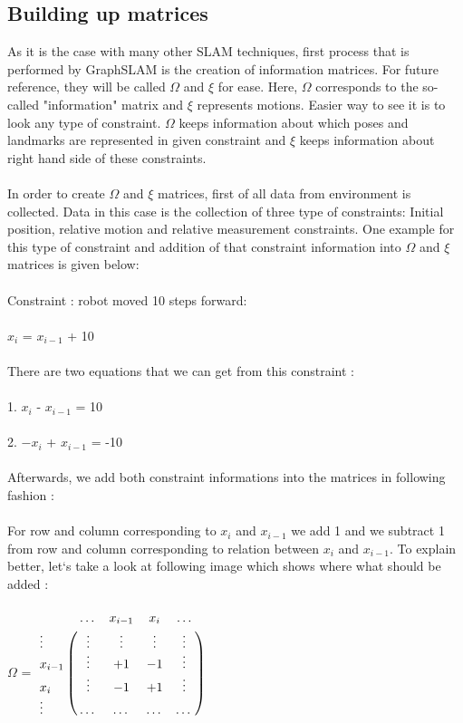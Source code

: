 \documentclass{ba-kecs}
\numberwithin{figure}{section}
\begin{document}
\subsection{Building up matrices}
	As it is the case with many other SLAM techniques, first process that is performed by GraphSLAM is the creation of information matrices. For future reference, they will be called $\Omega$ and $\xi$ for ease. Here, $\Omega$ corresponds to the so-called "information" matrix and $\xi$ represents motions. Easier way to see it is to look any type of constraint. $\Omega$ keeps information about which poses and landmarks are represented in given constraint and $\xi$ keeps information about right hand side of these constraints.\\ \\
	In order to create $\Omega$ and $\xi$ matrices, first of all data from environment is collected. Data in this case is the collection of three type of constraints: Initial position, relative motion and relative measurement constraints. One example for this type of constraint and addition of that constraint information into $\Omega$ and $\xi$ matrices is given below:\\ \\
	Constraint : robot moved 10 steps forward:\\ \\ $x_{i}$ = $x_{i-1}$ + 10 \\ \\
	There are two equations that we can get from this constraint : \\ \\
	1. $x_{i}$ - $x_{i-1}$ = 10 \\ \\
	2. $-x_{i}$ + $x_{i-1}$ = -10\\ \\
	Afterwards, we add both constraint informations into the matrices in following fashion :\\ \\
	For row and column corresponding to $x_{i}$ and $x_{i-1}$ we add 1 and we subtract 1 from row and column corresponding to relation between $x_{i}$ and $x_{i-1}$. To explain better, let`s take a look at following image which shows where what should be added :\\ \\
	$\Omega$ = $\bordermatrix{~ & \dots & x_{i-1} & x_{i} & \dots \cr
							\vdots & \vdots & \vdots & \vdots & \vdots \cr
                  			x_{i-1} & \vdots & +1 & -1 & \vdots \cr
                  			x_{i} & \vdots & -1 & +1 & \vdots \cr
                  			\vdots & \dots & \dots & \dots & \dots \cr}$ \\ \\
                  			
\end{document}

